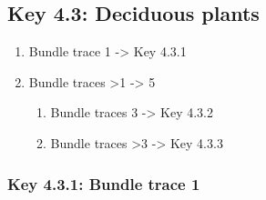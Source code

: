 \documentclass[openany]{book}
\providecommand{\tightlist}{%
  \setlength{\itemsep}{0pt}\setlength{\parskip}{0pt}}
\begin{document}
\hypertarget{key-4.3-deciduous-plants}{%
\subsection{Key 4.3: Deciduous plants}\label{key-4.3-deciduous-plants}}

\begin{enumerate}
\def\labelenumi{\arabic{enumi}.}
\tightlist
\item
  Bundle trace 1 -\textgreater{} Key 4.3.1
\item
  Bundle traces \textgreater{}1 -\textgreater{} 5

  \begin{enumerate}
  \def\labelenumii{\arabic{enumii}.}
  \setcounter{enumii}{2}
  \tightlist
  \item
    Bundle traces 3 -\textgreater{} Key 4.3.2
  \item
    Bundle traces \textgreater{}3 -\textgreater{} Key 4.3.3
  \end{enumerate}
\end{enumerate}

\hypertarget{key-4.3.1-bundle-trace-1}{%
\subsubsection{Key 4.3.1: Bundle trace
1}\label{key-4.3.1-bundle-trace-1}}
\end{document}
